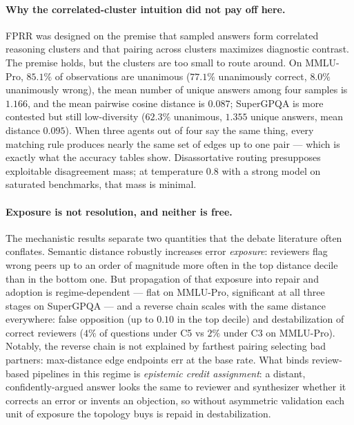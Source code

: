 \documentclass[11pt]{article}
\begin{document}
\paragraph{Why the correlated-cluster intuition did not pay off here.}
FPRR was designed on the premise that sampled answers form correlated reasoning clusters and that pairing across clusters maximizes diagnostic contrast. The premise holds, but the clusters are too small to route around. On MMLU-Pro, $85.1\%$ of observations are unanimous ($77.1\%$ unanimously correct, $8.0\%$ unanimously wrong), the mean number of unique answers among four samples is $1.166$, and the mean pairwise cosine distance is $0.087$; SuperGPQA is more contested but still low-diversity ($62.3\%$ unanimous, $1.355$ unique answers, mean distance $0.095$). When three agents out of four say the same thing, every matching rule produces nearly the same set of edges up to one pair --- which is exactly what the accuracy tables show. Disassortative routing presupposes exploitable disagreement mass; at temperature $0.8$ with a strong model on saturated benchmarks, that mass is minimal.

\paragraph{Exposure is not resolution, and neither is free.}
The mechanistic results separate two quantities that the debate literature often conflates. Semantic distance robustly increases error \emph{exposure}: reviewers flag wrong peers up to an order of magnitude more often in the top distance decile than in the bottom one. But propagation of that exposure into repair and adoption is regime-dependent --- flat on MMLU-Pro, significant at all three stages on SuperGPQA --- and a reverse chain scales with the same distance everywhere: false opposition (up to $0.10$ in the top decile) and destabilization of correct reviewers ($4\%$ of questions under C5 vs $2\%$ under C3 on MMLU-Pro). Notably, the reverse chain is not explained by farthest pairing selecting bad partners: max-distance edge endpoints err at the base rate. What binds review-based pipelines in this regime is \emph{epistemic credit assignment}: a distant, confidently-argued answer looks the same to reviewer and synthesizer whether it corrects an error or invents an objection, so without asymmetric validation each unit of exposure the topology buys is repaid in destabilization.
\end{document}
